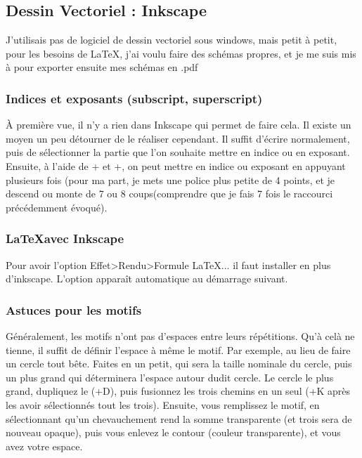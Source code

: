 \documentclass[a4paper,twoside]{article}
\begin{document}
\subsection{Dessin Vectoriel : Inkscape}
J'utilisais pas de logiciel de dessin vectoriel sous windows, mais petit à petit, pour les besoins de \LaTeX, j'ai voulu faire des schémas propres, et je me suis mis à  pour exporter ensuite mes schémas en .pdf

\subsubsection{Indices et exposants (subscript, superscript)}
À première vue, il n'y a rien dans Inkscape qui permet de faire cela. Il existe un moyen un peu détourner de le réaliser cependant. Il suffit d'écrire normalement, puis de sélectionner la partie que l'on souhaite mettre en indice ou en exposant. Ensuite, à l'aide de +\touche{\textuparrow} et +\touche{\textdownarrow}, on peut mettre en indice ou exposant en appuyant plusieurs fois (pour ma part, je mets une police plus petite de 4 points, et je descend ou monte de 7 ou 8 \og coups\fg (comprendre que je fais 7 fois le raccourci précédemment évoqué).

\subsubsection[LaTeX avec Inkscape]{\LaTeX avec Inkscape}
Pour avoir l'option Effet>Rendu>Formule LaTeX... il faut installer  en plus d'inkscape. L'option apparaît automatique au démarrage suivant.

\subsubsection{Astuces pour les motifs}
Généralement, les motifs n'ont pas d'espaces entre leurs répétitions. Qu'à celà ne tienne, il suffit de définir l'espace à même le motif. Par exemple, au lieu de faire un cercle tout bête. Faites en un petit, qui sera la taille nominale du cercle, puis un plus grand qui déterminera l'espace autour dudit cercle. Le cercle le plus grand, dupliquez le (+D), puis fusionnez les trois chemins en un seul (+K après les avoir sélectionnés tout les trois). Ensuite, vous remplissez le motif, en sélectionnant qu'un chevauchement rend la somme transparente (et trois sera de nouveau opaque), puis vous enlevez le contour (couleur transparente), et vous avez votre espace.
\end{document}
